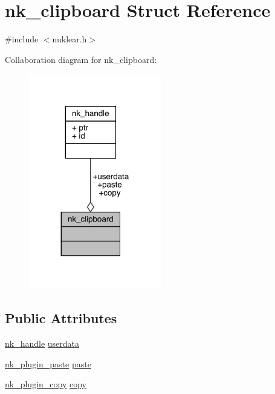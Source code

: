\hypertarget{structnk__clipboard}{}\section{nk\+\_\+clipboard Struct Reference}
\label{structnk__clipboard}


{\ttfamily \#include $<$nuklear.\+h$>$}



Collaboration diagram for nk\+\_\+clipboard\+:
\nopagebreak
\begin{figure}[H]
\begin{center}
\leavevmode
\includegraphics[width=164pt]{structnk__clipboard__coll__graph}
\end{center}
\end{figure}
\subsection*{Public Attributes}
\begin{DoxyCompactItemize}
\item 
\mbox{\hyperlink{unionnk__handle}{nk\+\_\+handle}} \mbox{\hyperlink{structnk__clipboard_a40e1bfd251716852fe3fa3f6856aeb2c}{userdata}}
\item 
\mbox{\hyperlink{nuklear_8h_a5c2f97ddb60956a8743b9f0a8cc5e813}{nk\+\_\+plugin\+\_\+paste}} \mbox{\hyperlink{structnk__clipboard_ac3224d9fcbceaed96f4c5740cd76797d}{paste}}
\item 
\mbox{\hyperlink{nuklear_8h_a01c2d0f210146bddb18fd3f4a5a9ec86}{nk\+\_\+plugin\+\_\+copy}} \mbox{\hyperlink{structnk__clipboard_a3fa8f2ea1924acce4456e714f575ddb4}{copy}}
\end{DoxyCompactItemize}


